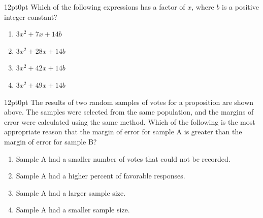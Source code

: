 \documentclass[11pt, twocolumn]{article}
\newcounter{questionnum}
\begin{document}
\vspace{6pt}\noindent
\begin{minipage}{\columnwidth}\raggedright
\noindent{}\par\vspace{8pt}
\begin{adjustwidth}{12pt}{0pt}
Which of the following expressions has a factor of $x$, where $b$ is a positive integer constant?
\begin{enumerate}[label=\Alph*),leftmargin=18pt,topsep=3pt,itemsep=2pt]
  \item $3 {x}^{2} + 7 x + 14 b$
  \item $3 {x}^{2} + 28 x + 14 b$
  \item $3 {x}^{2} + 42 x + 14 b$
  \item $3 {x}^{2} + 49 x + 14 b$
\end{enumerate}
\end{adjustwidth}
\end{minipage}\par

\vspace{6pt}\noindent
\begin{minipage}{\columnwidth}\raggedright
\noindent{}\par\vspace{8pt}
\begin{adjustwidth}{12pt}{0pt}
The results of two random samples of votes for a proposition are shown above. The samples were selected from the same population, and the margins of error were calculated using the same method. Which of the following is the most appropriate reason that the margin of error for sample A is greater than the margin of error for sample B?
\begin{enumerate}[label=\Alph*),leftmargin=18pt,topsep=3pt,itemsep=2pt]
  \item Sample A had a smaller number of votes that could not be recorded.
  \item Sample A had a higher percent of favorable responses.
  \item Sample A had a larger sample size.
  \item Sample A had a smaller sample size.
\end{enumerate}
\end{adjustwidth}
\end{minipage}\par
\end{document}
